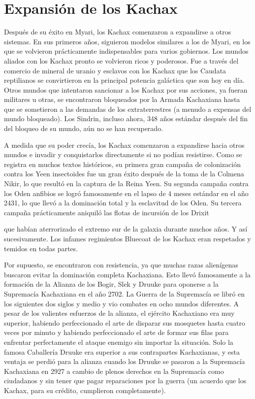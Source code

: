 \documentclass[spanish,12pt,a4paper,oneside,titlepage, twocolumn]{article}
\begin{document}
    \section*{\centering Expansión de los Kachax}

    Después de su éxito en Myari, los Kachax comenzaron a expandirse a otros sistemas. En sus primeros años, siguieron modelos similares a los de Myari, en los que se volvieron prácticamente indispensables para varios gobiernos. Los mundos aliados con los Kachax pronto se volvieron ricos y poderosos. Fue a través del comercio de mineral de uranio y esclavos con los Kachax que los Caudata reptilianos se convirtieron en la principal potencia galáctica que son hoy en día. Otros mundos que intentaron sancionar a los Kachax por sus acciones, ya fueran militares u otras, se encontraron bloqueados por la Armada Kachaxiana hasta que se sometieron a las demandas de los extraterrestres (a menudo a expensas del mundo bloqueado). Los Sindrin, incluso ahora, 348 años estándar después del fin del bloqueo de su mundo, aún no se han recuperado.

    A medida que su poder crecía, los Kachax comenzaron a expandirse hacia otros mundos e invadir y conquistarlos directamente si no podían resistirse. Como se registra en muchos textos históricos, su primera gran campaña de colonización contra los Yeen insectoides fue un gran éxito después de la toma de la Colmena Nikir, lo que resultó en la captura de la Reina Yeen. Su segunda campaña contra los Oden anfibios se logró famosamente en el lapso de 4 meses estándar en el año 2431, lo que llevó a la dominación total y la esclavitud de los Oden. Su tercera campaña prácticamente aniquiló las flotas de incursión de los Drixit

    que habían aterrorizado el extremo sur de la galaxia durante muchos años. Y así sucesivamente. Los infames regimientos Bluecoat de los Kachax eran respetados y temidos en todas partes.

    Por supuesto, se encontraron con resistencia, ya que muchas razas alienígenas buscaron evitar la dominación completa Kachaxiana. Esto llevó famosamente a la formación de la Alianza de los Bogir, Slek y Druuke para oponerse a la Supremacía Kachaxiana en el año 2702. La Guerra de la Supremacía se libró en los siguientes dos siglos y medio y vio combates en ocho mundos diferentes. A pesar de los valientes esfuerzos de la alianza, el ejército Kachaxiano era muy superior, habiendo perfeccionado el arte de disparar sus mosquetes hasta cuatro veces por minuto y habiendo perfeccionado el arte de formar sus filas para enfrentar perfectamente el ataque enemigo sin importar la situación. Solo la famosa Caballería Druuke era superior a sus contrapartes Kachaxianas, y esta ventaja se perdió para la alianza cuando los Druuke se pasaron a la Supremacía Kachaxiana en 2927 a cambio de plenos derechos en la Supremacía como ciudadanos y sin tener que pagar reparaciones por la guerra (un acuerdo que los Kachax, para su crédito, cumplieron completamente).
\end{document}
